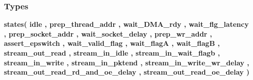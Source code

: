 \subsubsection*{Types}
 \begin{DoxyCompactItemize}
\item 
{\bfseries {\bf states}{\bfseries \textcolor{vhdlchar}{(}\textcolor{vhdlchar}{ }\textcolor{vhdlchar}{idle}\textcolor{vhdlchar}{ }\textcolor{vhdlchar}{,}\textcolor{vhdlchar}{ }\textcolor{vhdlchar}{prep\+\_\+thread\+\_\+addr}\textcolor{vhdlchar}{ }\textcolor{vhdlchar}{,}\textcolor{vhdlchar}{ }\textcolor{vhdlchar}{wait\+\_\+\+D\+M\+A\+\_\+rdy}\textcolor{vhdlchar}{ }\textcolor{vhdlchar}{,}\textcolor{vhdlchar}{ }\textcolor{vhdlchar}{wait\+\_\+flg\+\_\+latency}\textcolor{vhdlchar}{ }\textcolor{vhdlchar}{,}\textcolor{vhdlchar}{ }\textcolor{vhdlchar}{prep\+\_\+socket\+\_\+addr}\textcolor{vhdlchar}{ }\textcolor{vhdlchar}{,}\textcolor{vhdlchar}{ }\textcolor{vhdlchar}{wait\+\_\+socket\+\_\+delay}\textcolor{vhdlchar}{ }\textcolor{vhdlchar}{,}\textcolor{vhdlchar}{ }\textcolor{vhdlchar}{prep\+\_\+wr\+\_\+addr}\textcolor{vhdlchar}{ }\textcolor{vhdlchar}{,}\textcolor{vhdlchar}{ }\textcolor{vhdlchar}{assert\+\_\+epswitch}\textcolor{vhdlchar}{ }\textcolor{vhdlchar}{,}\textcolor{vhdlchar}{ }\textcolor{vhdlchar}{wait\+\_\+valid\+\_\+flag}\textcolor{vhdlchar}{ }\textcolor{vhdlchar}{,}\textcolor{vhdlchar}{ }\textcolor{vhdlchar}{wait\+\_\+flagA}\textcolor{vhdlchar}{ }\textcolor{vhdlchar}{,}\textcolor{vhdlchar}{ }\textcolor{vhdlchar}{wait\+\_\+flagB}\textcolor{vhdlchar}{ }\textcolor{vhdlchar}{,}\textcolor{vhdlchar}{ }\textcolor{vhdlchar}{stream\+\_\+out\+\_\+read}\textcolor{vhdlchar}{ }\textcolor{vhdlchar}{,}\textcolor{vhdlchar}{ }\textcolor{vhdlchar}{stream\+\_\+in\+\_\+idle}\textcolor{vhdlchar}{ }\textcolor{vhdlchar}{,}\textcolor{vhdlchar}{ }\textcolor{vhdlchar}{stream\+\_\+in\+\_\+wait\+\_\+flagb}\textcolor{vhdlchar}{ }\textcolor{vhdlchar}{,}\textcolor{vhdlchar}{ }\textcolor{vhdlchar}{stream\+\_\+in\+\_\+write}\textcolor{vhdlchar}{ }\textcolor{vhdlchar}{,}\textcolor{vhdlchar}{ }\textcolor{vhdlchar}{stream\+\_\+in\+\_\+pktend}\textcolor{vhdlchar}{ }\textcolor{vhdlchar}{,}\textcolor{vhdlchar}{ }\textcolor{vhdlchar}{stream\+\_\+in\+\_\+write\+\_\+wr\+\_\+delay}\textcolor{vhdlchar}{ }\textcolor{vhdlchar}{,}\textcolor{vhdlchar}{ }\textcolor{vhdlchar}{stream\+\_\+out\+\_\+read\+\_\+rd\+\_\+and\+\_\+oe\+\_\+delay}\textcolor{vhdlchar}{ }\textcolor{vhdlchar}{,}\textcolor{vhdlchar}{ }\textcolor{vhdlchar}{stream\+\_\+out\+\_\+read\+\_\+oe\+\_\+delay}\textcolor{vhdlchar}{ }\textcolor{vhdlchar}{)}\textcolor{vhdlchar}{ }}} 

\end{DoxyCompactItemize}
